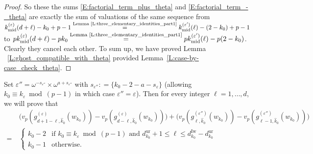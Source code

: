 \begin{proof}
    So these the sums \eqref{E:factorial_term_plus_theta} and \eqref{E:factorial_term_-_theta} are exactly the sum of valuations of the same sequence from $k_{{\mathrm{mid}}}^{(\varepsilon)}(d+\ell) - k_0+p-1 \stackrel{\text{Lemma~\ref{L:three_elementary_identities_part1}}}{=} k_{{\mathrm{mid}}}^{(\varepsilon')}(\ell) - (2-k_0)+p-1$ to $pk_{{\mathrm{mid}}}^{(\varepsilon)}(d+\ell) - pk_0 \stackrel{\text{Lemma~\ref{L:three_elementary_identities_part1}}}{=} pk_{{\mathrm{mid}}}^{(\varepsilon')}(\ell) -p (2-k_0)$. Clearly they cancel each other.
    To sum up, we have proved Lemma ~\eqref{L:ghost_compatible_with_theta} provided Lemma~\ref{L:case-by-case_check_theta}.
\end{proof}

\begin{lemma}
    \label{L:ghost_compatible_with_AL}
    Set $\varepsilon'' = \omega^{-s_{\varepsilon''}} \times \omega^{a+s_{\varepsilon''}}$ with $s_{\varepsilon''}: = \{{k_0}-  2-a-s_\varepsilon\}$ (allowing $k_0\equiv k_\varepsilon \bmod{(p-1)}$ in which case $\varepsilon''= \varepsilon$).
    Then for every integer $\ell =1, \dots, d$, we will prove that
    \begin{align*}
    &\big(v_p(g^{(\varepsilon)}_{d+1-\ell, \hat k_0}(w_{k_0})) - v_p(g^{(\varepsilon)}_{d-\ell, \hat k_0}(w_{k_0})) \big) + \big(v_p(g^{(\varepsilon'')}_{\ell, \hat k_0}(w_{k_0})) - v_p(g^{(\varepsilon'')}_{\ell-1, \hat k_0}(w_{k_0})) \big)
    \\
    \nonumber
    =\ & \begin{cases}
    {k_0}-2 & \textrm{if }k_0\equiv k_\varepsilon \bmod{(p-1)} \textrm{ and }d_{k_0}^{\mathrm{ur}}+1\leq  \ell \leq d_{k_0}^{\mathrm{Iw}}-d_{k_0}^{\mathrm{ur}}\\
    {k_0}-1 & \textrm{otherwise.}
    \end{cases}
    \end{align*}
\end{lemma}

